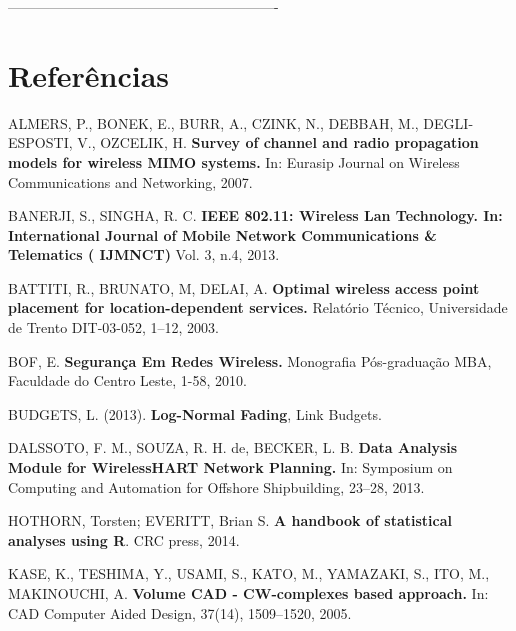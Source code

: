 \documentclass[
	12pt,				%
	openright,			%
	twoside,			%
	a4paper,			%
	english,			%
	french,				%
	spanish,			%
	brazil				%
	]{abntex2}
\begin{document}
 ----------------------------------------------------------
\postextual



\chapter[Referências]{Referências}
\noindent
ALMERS, P., BONEK, E., BURR, A., CZINK, N., DEBBAH, M., DEGLI-ESPOSTI, V., OZCELIK, H. \textbf{Survey of channel and radio propagation models for wireless MIMO systems.} In: Eurasip Journal on Wireless Communications and Networking, 2007.

\noindent
BANERJI, S., SINGHA, R. C. \textbf{IEEE 802.11: Wireless Lan Technology. In: International Journal of Mobile Network Communications \& Telematics ( IJMNCT)} Vol. 3, n.4, 2013.

\noindent
BATTITI, R., BRUNATO, M, DELAI, A. \textbf{Optimal wireless access point placement for location-dependent services.} Relatório Técnico, Universidade de Trento DIT-03-052, 1–12, 2003. 

\noindent
BOF, E. \textbf{Segurança Em Redes Wireless.} Monografia Pós-graduação MBA, Faculdade do Centro Leste, 1-58, 2010.

\noindent
BUDGETS, L. (2013). \textbf{Log-Normal Fading}, Link Budgets.

\noindent
DALSSOTO, F. M., SOUZA, R. H. de, BECKER, L. B. \textbf{Data Analysis Module for WirelessHART Network Planning.} In: Symposium on Computing and Automation for Offshore Shipbuilding, 23–28, 2013.

\noindent
HOTHORN, Torsten; EVERITT, Brian S. \textbf{A handbook of statistical analyses using R}. CRC press, 2014.

\noindent
KASE, K., TESHIMA, Y., USAMI, S., KATO, M., YAMAZAKI, S., ITO, M., MAKINOUCHI, A. \textbf{Volume CAD - CW-complexes based approach.} In: CAD Computer Aided Design, 37(14), 1509–1520, 2005.
\end{document}
